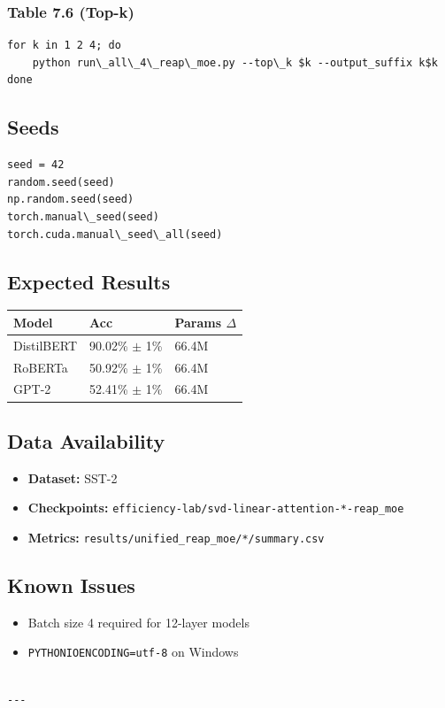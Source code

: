 \subsubsection{Table 7.6 (Top-k)}
\begin{lstlisting}
for k in 1 2 4; do
    python run\_all\_4\_reap\_moe.py --top\_k $k --output_suffix k$k
done
\end{lstlisting}

\subsection{Seeds}

\begin{lstlisting}
seed = 42
random.seed(seed)
np.random.seed(seed)
torch.manual\_seed(seed)
torch.cuda.manual\_seed\_all(seed)
\end{lstlisting}

\subsection{Expected Results}

\begin{table}[H]
\centering
\small
\begin{tabular}{lll}
\toprule
\textbf{Model} & \textbf{Acc} & \textbf{Params $\Delta$} \\
\midrule
DistilBERT & 90.02\% $\pm$ 1\% & 66.4M \\
RoBERTa & 50.92\% $\pm$ 1\% & 66.4M \\
GPT-2 & 52.41\% $\pm$ 1\% & 66.4M \\
\bottomrule
\end{tabular}
\end{table}

\subsection{Data Availability}

\begin{itemize}
\item \textbf{Dataset:} SST-2
\item \textbf{Checkpoints:} \texttt{efficiency-lab/svd-linear-attention-*-reap\_moe}
\item \textbf{Metrics:} \texttt{results/unified\_reap\_moe/*/summary.csv}

\end{itemize}
\subsection{Known Issues}

\begin{itemize}
\item Batch size 4 required for 12-layer models
\item \texttt{PYTHONIOENCODING=utf-8} on Windows
\end{itemize}
\begin{lstlisting}

---
\end{lstlisting}